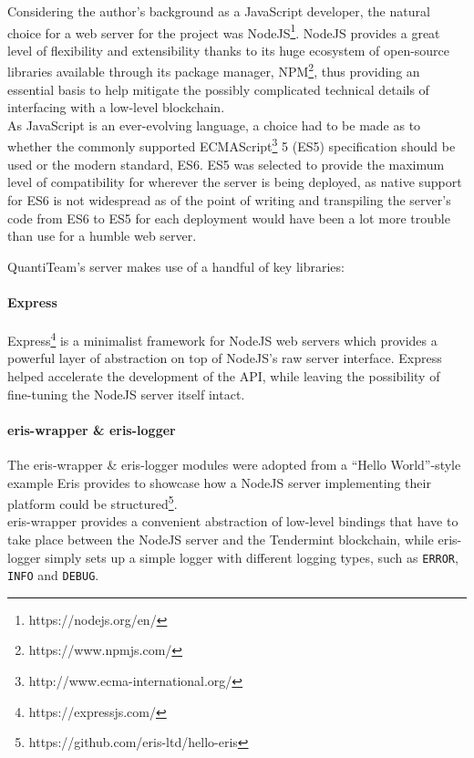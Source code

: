 Considering the author's background as a JavaScript developer, the
natural choice for a web server for the project was
NodeJS\footnote{https://nodejs.org/en/}. NodeJS provides a great
level of flexibility and extensibility thanks to its huge ecosystem of
open-source libraries available through its package manager,
NPM\footnote{https://www.npmjs.com/}, thus providing an essential
basis to help mitigate the possibly complicated technical details of
interfacing with a low-level blockchain.\\
As JavaScript is an ever-evolving language, a choice had to be made as
to whether the commonly supported
ECMAScript\footnote{http://www.ecma-international.org/} 5
(ES5) specification should be used or the modern standard, ES6. ES5 was
selected to provide the maximum level of compatibility for wherever the
server is being deployed, as native support for ES6 is not widespread as
of the point of writing and transpiling the server's code from ES6 to
ES5 for each deployment would have been a lot more trouble than use for
a humble web server.

QuantiTeam's server makes use of a handful of key libraries:

\paragraph{Express}\label{express}

Express\footnote{https://expressjs.com/} is a minimalist
framework for NodeJS web servers which provides a powerful layer of
abstraction on top of NodeJS's raw server interface. Express helped
accelerate the development of the API, while leaving the possibility of
fine-tuning the NodeJS server itself intact.

\paragraph{eris-wrapper \& eris-logger}\label{eris-wrapper-eris-logger}

The eris-wrapper \& eris-logger modules were adopted from a ``Hello
World''-style example Eris provides to showcase how a NodeJS server
implementing their platform could be
structured\footnote{https://github.com/eris-ltd/hello-eris}.\\
eris-wrapper provides a convenient abstraction of low-level bindings
that have to take place between the NodeJS server and the Tendermint
blockchain, while eris-logger simply sets up a simple logger with
different logging types, such as \texttt{ERROR}, \texttt{INFO} and
\texttt{DEBUG}.

